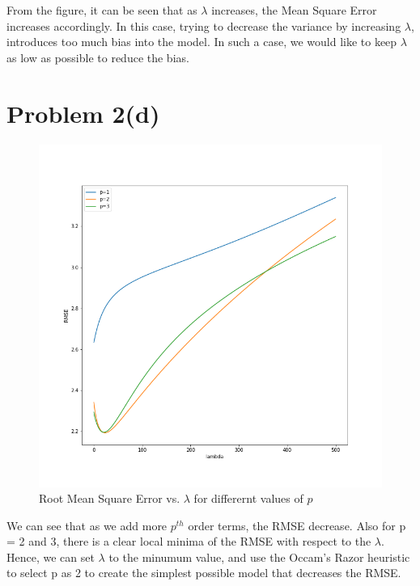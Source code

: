 \documentclass[openany,11pt]{homework}
\begin{document}
From the figure, it can be seen that as $\lambda$ increases, the Mean Square Error increases accordingly. In this case, trying to decrease the variance by increasing $\lambda$, introduces too much bias into the model. In such a case, we would like to keep $\lambda$ as low as possible to reduce the bias.

\section*{Problem 2(d)}
\begin{figure}[h]
	\includegraphics[width=\textwidth]{RMSE_vs_lambda_p}
	\caption{Root Mean Square Error vs. $\lambda$ for differernt values of $p$}
\end{figure}

We can see that as we add more $p^{th}$ order terms, the RMSE decrease. Also for p = 2 and 3, there is a clear local minima of the RMSE with respect to the $\lambda$. Hence, we can set $\lambda$ to the minumum value, and use the Occam's Razor heuristic to select p as 2 to create the simplest possible model that decreases the RMSE.
\end{document}
